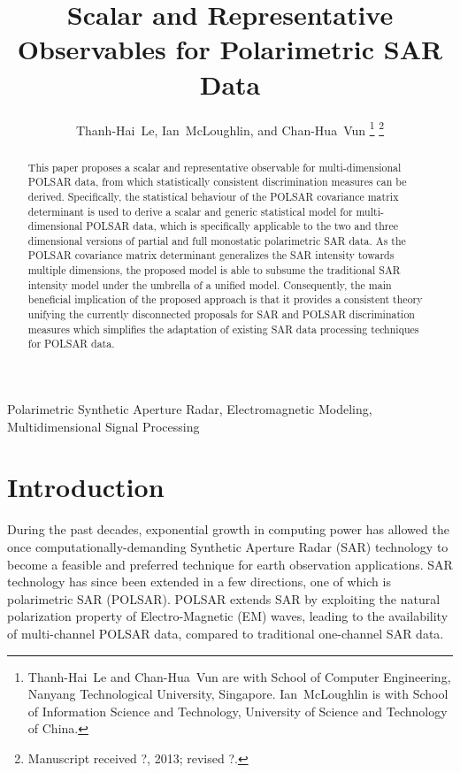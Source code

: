 \documentclass[journal]{IEEEtran}
\title{
  Scalar and Representative Observables for Polarimetric SAR Data
}
\author{Thanh-Hai~Le,
        Ian~McLoughlin, 
	and Chan-Hua~Vun%
\thanks{Thanh-Hai~Le and Chan-Hua~Vun are with School of Computer Engineering, 
Nanyang Technological University, Singapore. Ian~McLoughlin is with School of Information Science and Technology,
University of Science and Technology of China.
}%
\thanks{Manuscript received ?, 2013; revised ?.}}
\begin{document}
\maketitle

\begin{abstract}
This paper proposes a scalar and representative observable for multi-dimensional POLSAR data,
  from which statistically consistent discrimination measures can be derived.
Specifically, the statistical behaviour of the POLSAR covariance matrix determinant is used
  to derive a scalar and generic statistical model for multi-dimensional POLSAR data,
  which is specifically applicable to the two and three dimensional versions of partial and full monostatic polarimetric SAR data.
As the POLSAR covariance matrix determinant generalizes the SAR intensity towards multiple dimensions,
  the proposed model is able to subsume the traditional SAR intensity model under the umbrella of a unified model. 
Consequently, the main beneficial implication of the proposed approach is that
  it provides a consistent theory unifying the currently disconnected proposals for SAR and POLSAR discrimination measures
  which simplifies the adaptation of existing SAR data processing techniques for POLSAR data.
\end{abstract}

\begin{IEEEkeywords}
Polarimetric Synthetic Aperture Radar, Electromagnetic Modeling, Multidimensional Signal Processing  
\end{IEEEkeywords}

\IEEEpeerreviewmaketitle

\section{Introduction}

During the past decades, exponential growth in computing power has allowed the once computationally-demanding Synthetic Aperture Radar (SAR)
technology to become a feasible and preferred technique for earth observation applications.
SAR technology has since been extended in a few directions, one of which is polarimetric SAR (POLSAR).
POLSAR extends SAR by exploiting the natural polarization property of Electro-Magnetic (EM) waves,
  leading to the availability of multi-channel POLSAR data, compared to traditional one-channel SAR data.
  
\end{document}
